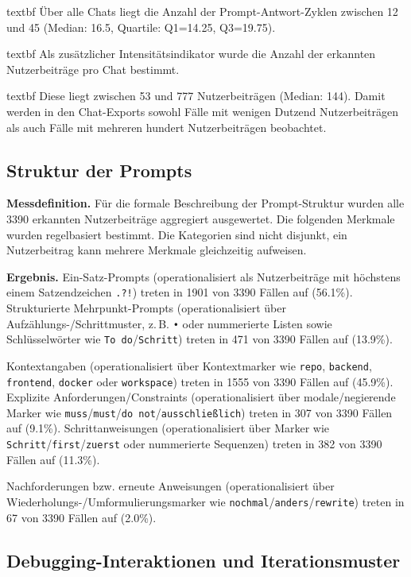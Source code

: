 	\csname textbf Über alle Chats liegt die Anzahl der Prompt-Antwort-Zyklen zwischen 12 und 45 (Median: 16.5, Quartile: Q1=14.25, Q3=19.75).

	\csname textbf Als zusätzlicher Intensitätsindikator wurde die Anzahl der erkannten Nutzerbeiträge pro Chat bestimmt.

	\csname textbf Diese liegt zwischen 53 und 777 Nutzerbeiträgen (Median: 144). Damit werden in den Chat-Exports sowohl Fälle mit wenigen Dutzend Nutzerbeiträgen als auch Fälle mit mehreren hundert Nutzerbeiträgen beobachtet.

\subsection{Struktur der Prompts}
\label{sec:results_chat_prompt_structure}

 \textbf{Messdefinition.} Für die formale Beschreibung der Prompt-Struktur wurden alle 3390 erkannten Nutzerbeiträge aggregiert ausgewertet.
Die folgenden Merkmale wurden regelbasiert bestimmt. Die Kategorien sind nicht disjunkt, ein Nutzerbeitrag kann mehrere Merkmale gleichzeitig aufweisen.

 \textbf{Ergebnis.} Ein-Satz-Prompts (operationalisiert als Nutzerbeiträge mit höchstens einem Satzendzeichen \texttt{.?!}) treten in 1901 von 3390 Fällen auf (56.1\%).
Strukturierte Mehrpunkt-Prompts (operationalisiert über Aufzählungs-/Schrittmuster, z.\,B. \texttt{•} oder nummerierte Listen sowie Schlüsselwörter wie \texttt{To do}/\texttt{Schritt}) treten in 471 von 3390 Fällen auf (13.9\%).

Kontextangaben (operationalisiert über Kontextmarker wie \texttt{repo}, \texttt{backend}, \texttt{frontend}, \texttt{docker} oder \texttt{workspace}) treten in 1555 von 3390 Fällen auf (45.9\%).
Explizite Anforderungen/Constraints (operationalisiert über modale/negierende Marker wie \texttt{muss}/\texttt{must}/\texttt{do not}/\texttt{ausschließlich}) treten in 307 von 3390 Fällen auf (9.1\%).
Schrittanweisungen (operationalisiert über Marker wie \texttt{Schritt}/\texttt{first}/\texttt{zuerst} oder nummerierte Sequenzen) treten in 382 von 3390 Fällen auf (11.3\%).

Nachforderungen bzw. erneute Anweisungen (operationalisiert über Wiederholungs-/Umformulierungsmarker wie \texttt{nochmal}/\texttt{anders}/\texttt{rewrite}) treten in 67 von 3390 Fällen auf (2.0\%).

\subsection{Debugging-Interaktionen und Iterationsmuster}
\label{sec:results_chat_debugging}

